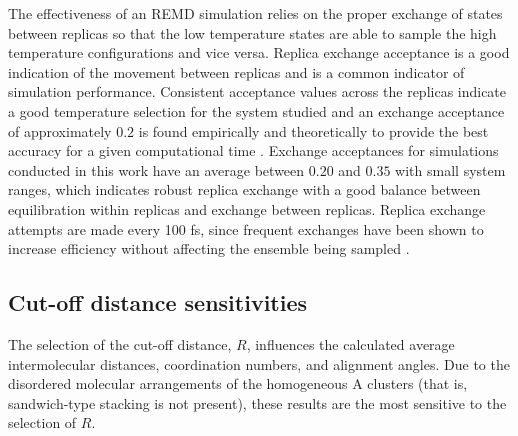 The effectiveness of an REMD simulation relies on the proper exchange of states between replicas so that the low temperature states are able to sample the high temperature configurations and vice versa. Replica exchange acceptance is a good indication of the movement between replicas and is a common indicator of simulation performance. Consistent acceptance values across the replicas indicate a good temperature selection for the system studied and an exchange acceptance of approximately $0.2$ is found empirically and theoretically to provide the best accuracy for a given computational time \cite{Rathore2005,Kone}. Exchange acceptances for simulations conducted in this work have an average between $0.20$ and $0.35$ with small system ranges, which indicates robust replica exchange with a good balance between equilibration within replicas and exchange between replicas. Replica exchange attempts are made every 100 fs, since frequent exchanges have been shown to increase efficiency without affecting the ensemble being sampled \cite{sindhikara2008exchange,sindhikara2010exchange}.

\subsection{Cut-off distance sensitivities}
\label{secSI:cutoffs}
The selection of the cut-off distance, $R$, influences the calculated average intermolecular distances, coordination numbers, and alignment angles. Due to the disordered molecular arrangements of the homogeneous A clusters (that is, sandwich-type stacking is not present), these results are the most sensitive to the selection of $R$.

